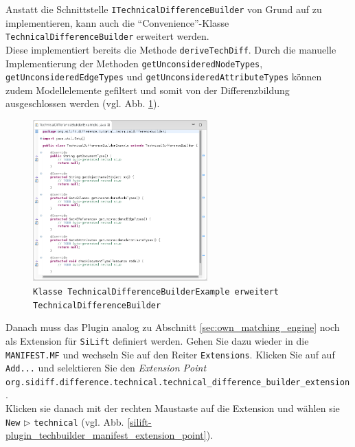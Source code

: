 \documentclass[a4paper]{scrartcl}
\begin{document}
Anstatt die Schnittstelle \texttt{ITechnicalDifferenceBuilder} von Grund auf zu implementieren, kann auch die ``Convenience''-Klasse \texttt{Technical\-Difference\-Builder} erweitert werden.\\
Diese implementiert bereits die Methode \texttt{deriveTechDiff}. Durch die manuelle Implementierung der Methoden \texttt{getUnconsideredNodeTypes}, \texttt{getUnconsideredEdgeTypes} und \texttt{getUnconsideredAttributeTypes} können zudem Modellelemente gefiltert und somit von der Differenzbildung ausgeschlossen werden (vgl. Abb. \ref{silift-plugin_techbuilder_techbuilder}).


\begin{figure}[H]
\centering
\includegraphics[width=0.6\textwidth]{graphics/silift-plugin_techbuilder_techbuilder.png}
\caption{\texttt{Klasse \texttt{TechnicalDifferenceBuilderExample} erweitert \texttt{TechnicalDifferenceBuilder}}}
\label{silift-plugin_techbuilder_techbuilder}
\end{figure}

Danach muss das Plugin analog zu Abschnitt \ref{sec:own_matching_engine} noch als Extension für \texttt{SiLift} definiert werden.
Gehen Sie dazu wieder in die \texttt{MANIFEST.MF} und wechseln Sie auf den Rei\-ter \texttt{Extensions}. Klicken Sie auf auf \texttt{Add...} und selektieren Sie den \textit{Extension Point} \texttt{org.sidiff.difference.technical.technical\_difference\_builder\_extension} .\\
Klicken sie danach mit der rechten Maustaste auf die Extension und wählen sie \texttt{New} $\triangleright$ \texttt{technical} (vgl. Abb. \ref{silift-plugin_techbuilder_manifest_extension_point}).
\end{document}
